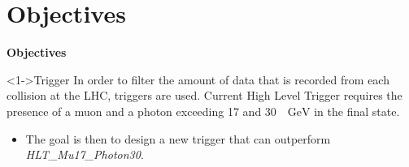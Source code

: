 \documentclass[aspectratio = 1610, xcolor = dvipsnames]{beamer}
\newcommand{\GeV}{\textrm{ }\mathrm{GeV}}
\newcommand{\red}{\textcolor{unipd}}
\begin{document}
	
	\section{Objectives}
        \begin{frame}[t]{\bf Objectives}
            \begin{block}<1->{Trigger}
                In order to filter the amount of data that is recorded from each collision at the LHC, triggers are used. Current High Level Trigger requires the presence of a muon and a photon exceeding 17 and 30 $\GeV$ in the final state.
            \end{block}
            \begin{itemize}
                \item The \red{goal} is then to design a new trigger that can outperform {\it HLT\_Mu17\_Photon30}.
            \end{itemize}
        \end{frame}
	
	
\end{document}
